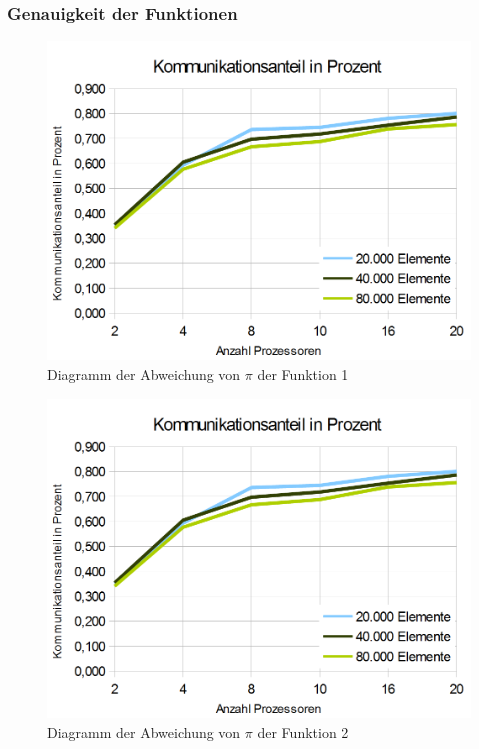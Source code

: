\documentclass[a4paper,12pt]{scrartcl}
\begin{document}
\subsubsection{Genauigkeit der Funktionen}
\begin{figure}[htb]
  \begin{center}
    \includegraphics[width=1\hsize]{../Kommunikationsanteil.PNG}
  \end{center}
  \caption{\label{mpikommoverhead}
    Diagramm der Abweichung von $\pi$ der Funktion 1}
\end{figure}
\begin{figure}[htb]
  \begin{center}
    \includegraphics[width=1\hsize]{../Kommunikationsanteil.PNG}
  \end{center}
  \caption{\label{mpikommoverhead}
    Diagramm der Abweichung von $\pi$ der Funktion 2}
\end{figure}
\end{document}

